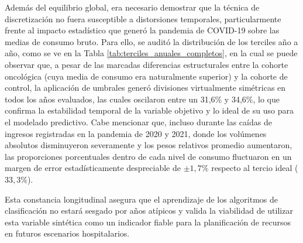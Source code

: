 Además del equilibrio global, era necesario demostrar que la técnica de discretización no fuera susceptible a distorsiones temporales, particularmente frente al impacto estadístico que generó la pandemia de COVID-19 sobre las medias de consumo bruto. Para ello, se auditó la distribución de los terciles año a año, como se ve en la Tabla \ref{tab:terciles_anuales_completos}, en la cual se puede observar que, a pesar de las marcadas diferencias estructurales entre la cohorte oncológica (cuya media de consumo era naturalmente superior) y la cohorte de control, la aplicación de umbrales generó divisiones virtualmente simétricas en todos los años evaluados, las cuales oscilaron entre un 31,6\% y 34,6\%, lo que confirma la estabilidad temporal de la variable objetivo y lo ideal de su uso para el modelado predictivo. Cabe mencionar que, incluso durante las caídas de ingresos registradas en la  pandemia de 2020 y 2021, donde los volúmenes absolutos disminuyeron severamente y los pesos relativos promedio aumentaron, las proporciones porcentuales dentro de cada nivel de consumo fluctuaron en un margen de error estadísticamente despreciable de $\pm 1,7\%$ respecto al tercio ideal ($33,3\%$).

Esta constancia longitudinal asegura que el aprendizaje de los algoritmos de clasificación no estará sesgado por años atípicos y valida la viabilidad de utilizar esta variable sintética como un indicador fiable para la planificación de recursos en futuros escenarios hospitalarios. 


